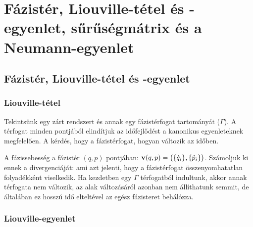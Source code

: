 \chapter{F\'azist\'er, Liouville-t\'etel és -egyenlet, s\H{u}r\H{u}s\'egm\'atrix és a Neumann-egyenlet}
 
 \section{Fázistér, Liouville-t\'etel és -egyenlet}
  
  \subsection{Liouville-tétel}
   
   Tekintsünk egy zárt rendszert és annak egy fázistérfogat tartományát ($\Gamma$). A térfogat minden pontjából elindítjuk az időfejlődést a kanonikus egyenleteknek megfelelően. A kérdés, hogy a fázistérfogat, hogyan változik az időben. 
   
   A fázissebesség a fázistér $(q,p)$ pontjában: $\mathbf{v}(q,p)=\big(\{\dot{q}_i\},\{\dot{p}_i\}\big)$. Számoljuk ki ennek a divergenciáját:
   ami azt jelenti, hogy a fázistérfogat összenyomhatatlan folyadékként viselkedik. Ha kezdetben egy $\Gamma$ térfogatból indultunk, akkor annak térfogata nem változik, az alak változásáról azonban nem állíthatunk semmit, de általában ez hosszú idő elteltével az egész fázisteret behálózza.
   
  \subsection{Liouville-egyenlet}
   
